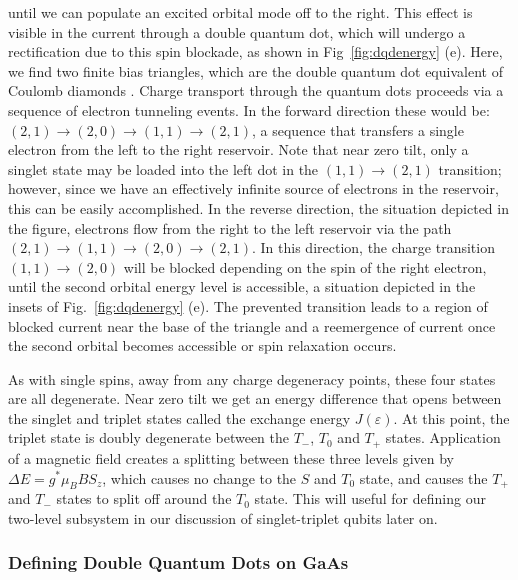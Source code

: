 until we can populate an excited orbital mode off to the right. This effect is visible in the current through a double
quantum dot, which will undergo a rectification due to this spin blockade, as shown in Fig~\ref{fig:dqdenergy} (e).
Here, we find two finite bias triangles, which are the double quantum dot equivalent of Coulomb diamonds \cite{PhysRevB.72.165308}.
Charge transport through the quantum dots proceeds via a sequence of electron tunneling events. In the forward direction
these would be: $(2, 1) \rightarrow (2, 0) \rightarrow (1, 1) \rightarrow (2, 1)$, a sequence that transfers a single electron
from the left to the right reservoir. Note that near zero tilt, only a singlet state may be loaded into the left dot
in the $(1, 1) \rightarrow (2, 1)$ transition; however, since we have an effectively infinite source of electrons in the
reservoir, this can be easily accomplished. In the reverse direction, the situation depicted in the figure, electrons flow
from the right to the left reservoir via the path $(2, 1) \rightarrow (1, 1) \rightarrow (2, 0) \rightarrow (2, 1)$.
In this direction, the charge transition $(1, 1) \rightarrow (2, 0)$ will be blocked depending on the spin of the right
electron, until the second orbital energy level is accessible, a situation depicted in the insets of Fig.~\ref{fig:dqdenergy} (e).
The prevented transition leads to a region of blocked current near the base of the triangle and a reemergence of current once the second orbital
becomes accessible or spin relaxation occurs.

As with single spins, away from any charge degeneracy points, these four states are all degenerate. Near zero tilt we get an
energy difference that opens between the singlet and triplet states called the exchange energy $J(\varepsilon)$. At this
point, the triplet state is doubly degenerate between the $T_-$, $T_0$ and $T_+$ states. Application of a magnetic field creates
a splitting between these three levels given by $\Delta E = g^* \mu_B B S_z$, which causes no change to the $S$ and $T_0$ state,
and causes the $T_+$ and $T_-$ states to split off around the $T_0$ state. This will useful for defining our two-level subsystem
in our discussion of singlet-triplet qubits later on.

\subsubsection{Defining Double Quantum Dots on GaAs}

